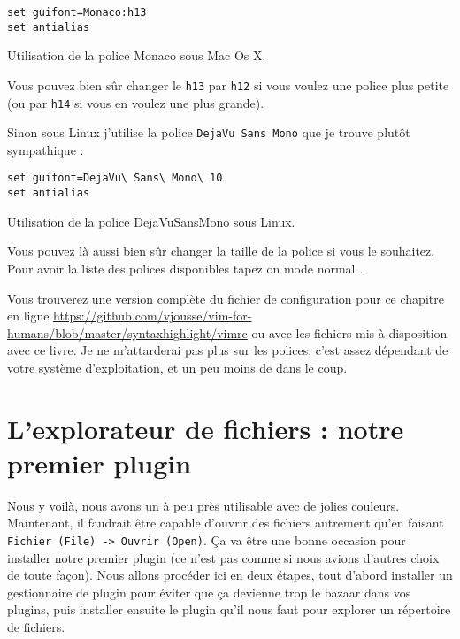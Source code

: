 \begin{listing}[H]
\begin{verbatim}
set guifont=Monaco:h13
set antialias
\end{verbatim}
  \caption{Utilisation de la police Monaco sous Mac Os X.}
  \label{lst:monaco}
\end{listing}

Vous pouvez bien sûr changer le \Verb|h13| par \Verb|h12| si vous voulez une police plus petite (ou par \Verb|h14| si vous en voulez une plus grande).

Sinon sous Linux j'utilise la police \Verb|DejaVu Sans Mono| que je trouve plutôt sympathique :

\begin{listing}[H]
\begin{verbatim}
set guifont=DejaVu\ Sans\ Mono\ 10
set antialias
\end{verbatim}
  \caption{Utilisation de la police DejaVuSansMono sous Linux.}
  \label{lst:dejavusansmono}
\end{listing}

Vous pouvez là aussi bien sûr changer la taille de la police si vous le souhaitez. Pour avoir la liste des polices disponibles tapez on mode normal .

Vous trouverez une version complète du fichier de configuration pour ce chapitre en ligne \url{https://github.com/vjousse/vim-for-humans/blob/master/syntaxhighlight/vimrc} ou avec les fichiers mis à disposition avec ce livre. Je ne m'attarderai pas plus sur les polices, c'est assez dépendant de votre système d'exploitation, et un peu moins de \vim dans le coup.


\section{L'explorateur de fichiers : notre premier plugin}

Nous y voilà, nous avons un \vim à peu près utilisable avec de jolies couleurs. Maintenant, il faudrait être capable d'ouvrir des fichiers autrement qu'en faisant \Verb|Fichier (File) -> Ouvrir (Open)|. Ça va être une bonne occasion pour installer notre premier plugin (ce n'est pas comme si nous avions d'autres choix de toute façon). Nous allons procéder ici en deux étapes, tout d'abord installer un gestionnaire de plugin pour éviter que ça devienne trop le bazaar dans vos plugins, puis installer ensuite le plugin qu'il nous faut pour explorer un répertoire de fichiers.

